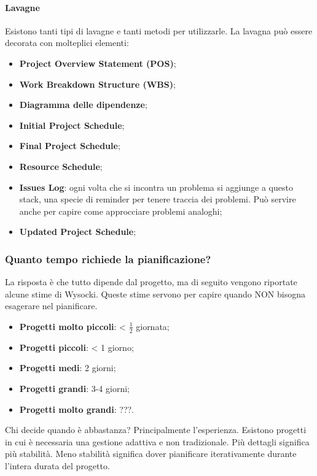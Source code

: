 \paragraph{Lavagne}
Esistono tanti tipi di lavagne e tanti metodi per utilizzarle. La lavagna può essere decorata con molteplici elementi:
\begin{itemize}
	\item \textbf{Project Overview Statement (POS)};
	\item \textbf{Work Breakdown Structure (WBS)};
	\item \textbf{Diagramma delle dipendenze};
	\item \textbf{Initial Project Schedule};
	\item \textbf{Final Project Schedule};
	\item \textbf{Resource Schedule};
	\item \textbf{Issues Log}: ogni volta che si incontra un problema si aggiunge a questo stack, una specie di reminder per tenere traccia dei problemi. Può servire anche per capire come approcciare problemi analoghi;
	\item \textbf{Updated Project Schedule};
\end{itemize}

\subsubsection{Quanto tempo richiede la pianificazione?}
La risposta è che tutto dipende dal progetto, ma di seguito vengono riportate alcune stime di Wysocki. Queste stime servono per capire quando NON bisogna esagerare nel pianificare.
\begin{itemize}
	\item \textbf{Progetti molto piccoli}: < $\frac{1}{2}$ giornata;
	\item \textbf{Progetti piccoli}: < 1 giorno;
	\item \textbf{Progetti medi}: 2 giorni;
	\item \textbf{Progetti grandi}: 3-4 giorni;
	\item \textbf{Progetti molto grandi}: ???.
\end{itemize}
Chi decide quando è abbastanza? Principalmente l'esperienza. Esistono progetti in cui è necessaria una gestione adattiva e non tradizionale. Più dettagli significa più stabilità. Meno stabilità significa dover pianificare iterativamente durante l'intera durata del progetto.
